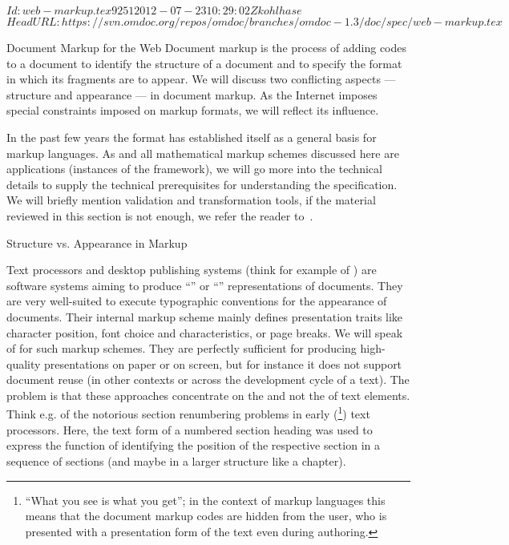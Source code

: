 \svnInfo $Id: web-markup.tex 9251 2012-07-23 10:29:02Z kohlhase $
\svnKeyword $HeadURL: https://svn.omdoc.org/repos/omdoc/branches/omdoc-1.3/doc/spec/web-markup.tex $

\begin{tchapter}[id=markup-web]{Document Markup for the Web}
Document markup is the process of adding codes to a document to identify the
structure of a document and to specify the format in which its fragments are to
appear. We will discuss two conflicting aspects --- structure and appearance ---
in document markup. As the Internet imposes special constraints imposed on markup
formats, we will reflect its influence.

In the past few years the {\xml} format has established itself as a general basis for
markup languages. As {\omdoc} and all mathematical markup schemes discussed here are
{\xml} applications (instances of the {\xml}
framework), we will go more into the technical details to supply
the technical prerequisites for understanding the specification.  We will briefly mention
{\xml} validation and transformation tools, if the material reviewed in this section is
not enough, we refer the reader to~\cite{Harold:xb01}.

\begin{tsection}[id=markup-types]{Structure vs. Appearance in Markup}

  Text processors and desktop publishing systems (think for example of
  {}) are software systems aiming to produce
  ``{}'' or ``{}'' representations of documents.
  They are very well-suited to execute typographic conventions for the appearance of
  documents. Their internal markup scheme mainly defines presentation traits like
  character position, font choice and characteristics, or page breaks.  We will speak of
  {} for such markup schemes.  They are perfectly sufficient
  for producing high-quality presentations on paper or on screen, but for instance it does
  not support document reuse (in other contexts or across the development cycle of a
  text). The problem is that these approaches concentrate on the {} and not the
  {} of text elements.  Think e.g. of the notorious section renumbering
  problems in early ({}\footnote{``What you see is what you get''; in
    the context of markup languages this means that the document markup codes are hidden
    from the user, who is presented with a presentation form of the text even during
    authoring.}) text processors.  Here, the text form of a numbered section heading was
  used to express the function of identifying the position of the respective section in a
  sequence of sections (and maybe in a larger structure like a chapter).


\end{tsection}
\end{tchapter}
